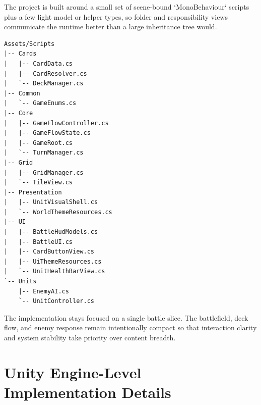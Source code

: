 The project is built around a small set of scene-bound `MonoBehaviour` scripts plus a few light model or helper types, so folder and responsibility views communicate the runtime better than a large inheritance tree would.

\begin{Verbatim}[fontsize=\small]
Assets/Scripts
|-- Cards
|   |-- CardData.cs
|   |-- CardResolver.cs
|   `-- DeckManager.cs
|-- Common
|   `-- GameEnums.cs
|-- Core
|   |-- GameFlowController.cs
|   |-- GameFlowState.cs
|   |-- GameRoot.cs
|   `-- TurnManager.cs
|-- Grid
|   |-- GridManager.cs
|   `-- TileView.cs
|-- Presentation
|   |-- UnitVisualShell.cs
|   `-- WorldThemeResources.cs
|-- UI
|   |-- BattleHudModels.cs
|   |-- BattleUI.cs
|   |-- CardButtonView.cs
|   |-- UiThemeResources.cs
|   `-- UnitHealthBarView.cs
`-- Units
    |-- EnemyAI.cs
    `-- UnitController.cs
\end{Verbatim}

The implementation stays focused on a single battle slice. The battlefield, deck flow, and enemy response remain intentionally compact so that interaction clarity and system stability take priority over content breadth.

\section{Unity Engine-Level Implementation Details}

